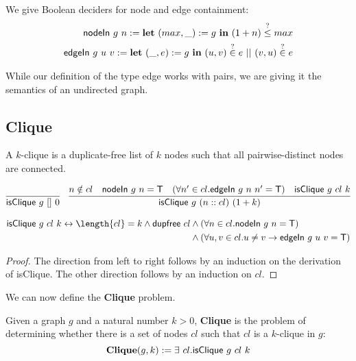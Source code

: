 \documentclass[a4paper,UKenglish,cleveref, autoref]{lipics-v2019}
\begin{document}
We give Boolean deciders for node and edge containment:
\begin{align*}
  \textsf{nodeIn}~g~n := \textbf{let}~ (max, \_) := g~\textbf{in}~ (1 + n) \overset{?}{\le} max\\
  \textsf{edgeIn}~g~u~v := \textbf{let}~ (\_, e) := g~\textbf{in}~ (u, v) \overset{?}{\in} e~||~(v, u) \overset{?}{\in} e
\end{align*}

While our definition of the type \textsf{edge} works with pairs, we are giving it the semantics of an undirected graph.

\subsection{Clique}
A $k$-clique is a duplicate-free list of $k$ nodes such that all pairwise-distinct nodes are connected.

\begin{align*}
  \infer{\textsf{isClique}~g~[]~0}{} && \infer{\textsf{isClique}~g~(n::cl)~(\natS k)}{n \notin cl \quad \textsf{nodeIn}~g~n = \btrue \quad (\forall n' \in cl. \textsf{edgeIn}~g~n~n' = \btrue) \quad \textsf{isClique}~g~cl~k}
\end{align*}

\begin{lemma}\label{prop:cliqueexpl}
  \begin{align*}
    \normalfont\textsf{isClique}~g~cl~k \leftrightarrow \length{cl} = k \land \normalfont\textsf{dupfree}~cl &\land (\forall n \in cl. \normalfont\textsf{nodeIn}~g~n = \btrue) \\
    &\land (\forall u,v \in cl. u \neq v \rightarrow \normalfont\textsf{edgeIn}~g~u~v = \btrue)
  \end{align*}
\end{lemma}
\begin{proof}
  The direction from left to right follows by an induction on the derivation of \textsf{isClique}. The other direction follows by an induction on $cl$.
\end{proof}

We can now define the \textbf{Clique} problem.

\begin{definition}
  Given a graph $g$ and a natural number $k > 0$, \textbf{Clique} is the problem of determining whether there is a set of nodes $cl$ such that $cl$ is a $k$-clique in $g$:
  \[\normalfont\textbf{Clique} (g, k) := \exists~cl. \normalfont\textsf{isClique}~g~cl~k \]
\end{definition}
\end{document}
